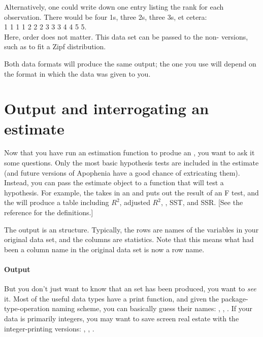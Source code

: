 Alternatively, one could 
write down one entry listing the rank for each observation. There would
be four 1s, three 2s, three 3s, et cetera:\\
1 1 1 1 2 2 2 3 3 3 4 4 5 5.\\
Here, order does not matter.  This data set can be passed to the
non- versions, such as  to fit a
Zipf distribution.

Both data formats will produce the same output; the one you use will
depend on the format in which the data was given to you.




\section{Output and interrogating an estimate}
Now that you have run an estimation function to produe an 
, you want to ask it some questions. Only the most
basic hypothesis tests are included in the estimate (and future versions
of Apophenia have a good chance of extricating them). Instead, you can
pass the estimate object to a function that will test a hypothesis. For
example, the  takes in an 
 and puts out the result of an F test, and the
 will produce a
table including $R^2$, adjusted $R^2$, , SST, and SSR. [See the
reference for the definitions.] 

The output is an  structure. Typically, the rows are
names of the variables in your original data set, and the columns are
statistics. Note that this means what had been a column name in the 
original data set is now a row name.

\paragraph{Output} 
But you don't just want to know that an  set has been
produced, you want to {\sl see} it.  Most of the useful data types have
a print function, and given the package-type-operation naming scheme,
you can basically guess their names: ,
, . If your
data is primarily integers, you may want to save screen real estate
with the integer-printing versions: ,
, .

